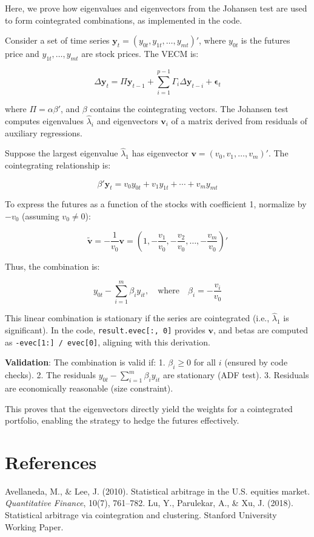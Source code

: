 \documentclass[a4paper,12pt]{article}
\begin{document}
Here, we prove how eigenvalues and eigenvectors from the Johansen test are used to form cointegrated combinations, as implemented in the code.

Consider a set of time series \(\mathbf{y}_t = (y_{0t}, y_{1t}, \ldots, y_{mt})'\), where \(y_{0t}\) is the futures price and \(y_{1t}, \ldots, y_{mt}\) are stock prices. The VECM is:

\[
\Delta \mathbf{y}_t = \Pi \mathbf{y}_{t-1} + \sum_{i=1}^{p-1} \Gamma_i \Delta \mathbf{y}_{t-i} + \mathbf{\epsilon}_t
\]

where \(\Pi = \alpha \beta'\), and \(\beta\) contains the cointegrating vectors. The Johansen test computes eigenvalues \(\hat{\lambda}_i\) and eigenvectors \(\mathbf{v}_i\) of a matrix derived from residuals of auxiliary regressions.

Suppose the largest eigenvalue \(\hat{\lambda}_1\) has eigenvector \(\mathbf{v} = (v_0, v_1, \ldots, v_m)'\). The cointegrating relationship is:

\[
\beta' \mathbf{y}_t = v_0 y_{0t} + v_1 y_{1t} + \cdots + v_m y_{mt}
\]

To express the futures as a function of the stocks with coefficient 1, normalize by \(-v_0\) (assuming \(v_0 \neq 0\)):

\[
\mathbf{\tilde{v}} = -\frac{1}{v_0} \mathbf{v} = \left(1, -\frac{v_1}{v_0}, -\frac{v_2}{v_0}, \ldots, -\frac{v_m}{v_0}\right)'
\]

Thus, the combination is:

\[
y_{0t} - \sum_{i=1}^{m} \beta_i y_{it}, \quad \text{where} \quad \beta_i = -\frac{v_i}{v_0}
\]

This linear combination is stationary if the series are cointegrated (i.e., \(\hat{\lambda}_1\) is significant). In the code, \texttt{result.evec[:, 0]} provides \(\mathbf{v}\), and betas are computed as \texttt{-evec[1:] / evec[0]}, aligning with this derivation.

\textbf{Validation}: The combination is valid if:
1. \(\beta_i \geq 0\) for all \(i\) (ensured by code checks).
2. The residuals \(y_{0t} - \sum_{i=1}^{m} \beta_i y_{it}\) are stationary (ADF test).
3. Residuals are economically reasonable (size constraint).

This proves that the eigenvectors directly yield the weights for a cointegrated portfolio, enabling the strategy to hedge the futures effectively.

\section{References}

\begin{thebibliography}{9}
Avellaneda, M., \& Lee, J. (2010). Statistical arbitrage in the U.S. equities market. \textit{Quantitative Finance}, 10(7), 761–782.
Lu, Y., Parulekar, A., \& Xu, J. (2018). Statistical arbitrage via cointegration and clustering. Stanford University Working Paper.
\end{thebibliography}
\end{document}
